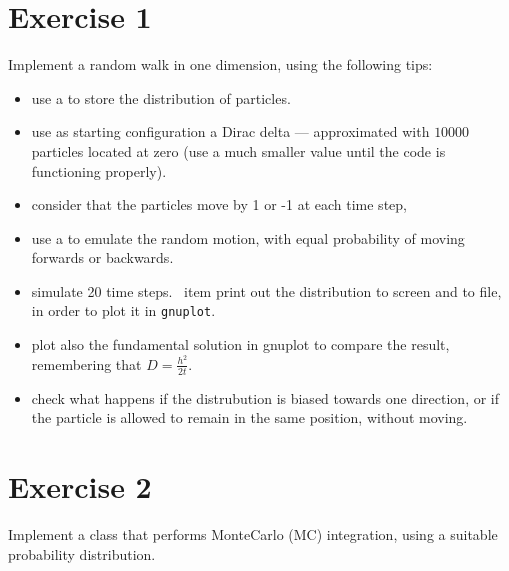\section*{Exercise 1}

Implement a random walk in one dimension, using the following tips:
\begin{itemize}
  \item use a  to store the distribution of particles.
  \item use as starting configuration a Dirac delta --- approximated with
  $10000$ particles located at zero (use a much smaller value until the code
  is functioning properly).
  \item consider that the particles move by 1 or -1 at each time step,
  \item use a  to emulate the random motion, with
  equal probability of moving forwards or backwards.
  \item simulate 20 time steps.
  \ item print out the distribution to screen and to file, in order to plot it
  in \texttt{gnuplot}.
  \item plot also the fundamental solution in gnuplot to compare the result,
  remembering that $D = \frac{h^2}{2t}$.
  \item check what happens if the distrubution is biased towards one direction,
  or if the particle is allowed to remain in the same position, without	moving.
\end{itemize}

\section*{Exercise 2}

Implement a class that performs MonteCarlo (MC) integration, using a suitable
probability distribution.

